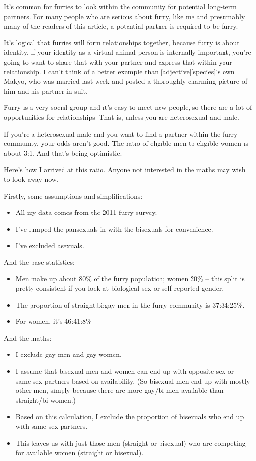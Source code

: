 
It’s common for furries to look within the community for potential long-term partners. For many people who are serious about furry, like me and presumably many of the readers of this article, a potential partner is required to be furry.

It’s logical that furries will form relationships together, because furry is about identity. If your identity as a virtual animal-person is internally important, you’re going to want to share that with your partner and express that within your relationship. I can’t think of a better example than [adjective][species]’s own Makyo, who was married last week and posted a thoroughly charming picture of him and his partner in suit.

Furry is a very social group and it’s easy to meet new people, so there are a lot of opportunities for relationships. That is, unless you are heterosexual and male.

If you’re a heterosexual male and you want to find a partner within the furry community, your odds aren’t good. The ratio of eligible men to eligible women is about 3:1. And that’s being optimistic.

Here’s how I arrived at this ratio. Anyone not interested in the maths may wish to look away now.

Firstly, some assumptions and simplifications:
\begin{itemize}
  \item All my data comes from the 2011 furry survey.
  \item I’ve lumped the pansexuals in with the bisexuals for convenience.
  \item I’ve excluded asexuals.
\end{itemize}
And the base statistics:
\begin{itemize}
  \item Men make up about 80\% of the furry population; women 20\% -- this split is pretty consistent if you look at biological sex or self-reported gender.
  \item The proportion of straight:bi:gay men in the furry community is 37:34:25\%.
  \item For women, it’s 46:41:8\%
\end{itemize}
And the maths:
\begin{itemize}
  \item I exclude gay men and gay women.
  \item I assume that bisexual men and women can end up with opposite-sex or same-sex partners based on availability. (So bisexual men end up with mostly other men, simply because there are more gay/bi men available than straight/bi women.)
  \item Based on this calculation, I exclude the proportion of bisexuals who end up with same-sex partners.
  \item This leaves us with just those men (straight or bisexual) who are competing for available women (straight or bisexual).
\end{itemize}

